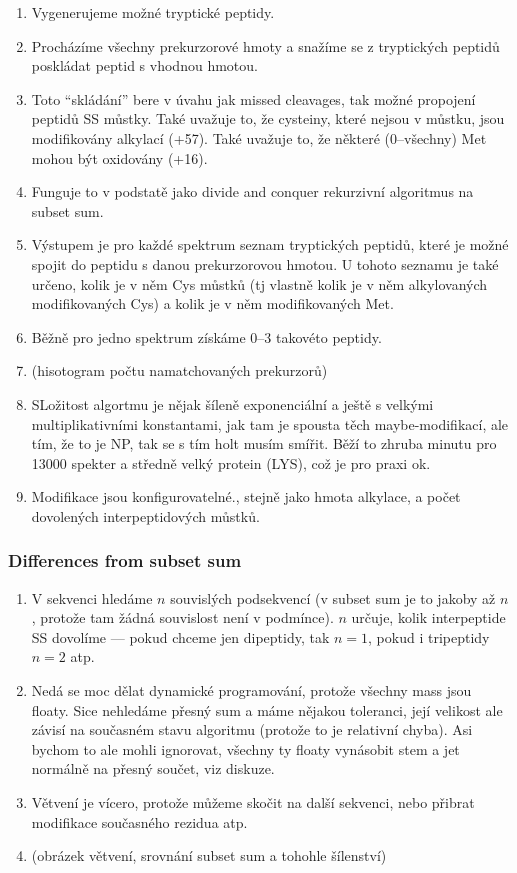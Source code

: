 \begin{enumerate}
	\item Vygenerujeme možné tryptické peptidy.
	\item Procházíme všechny prekurzorové hmoty a snažíme se z tryptických peptidů poskládat peptid s vhodnou hmotou.
	\item Toto ``skládání'' bere v úvahu jak missed cleavages, tak možné propojení peptidů SS můstky. Také uvažuje to, že cysteiny, které nejsou v můstku, jsou modifikovány alkylací (+57). Také uvažuje to, že některé (0–všechny) Met mohou být oxidovány (+16).
	\item Funguje to v podstatě jako divide and conquer rekurzivní algoritmus na subset sum.
	\item Výstupem je pro každé spektrum seznam tryptických peptidů, které je možné spojit do peptidu s danou prekurzorovou hmotou. U tohoto seznamu je také určeno, kolik je v něm Cys můstků (tj vlastně kolik je v něm alkylovaných modifikovaných Cys) a kolik je v něm modifikovaných Met.
	\item Běžně pro jedno spektrum získáme 0–3 takovéto peptidy.
	\item (hisotogram počtu namatchovaných prekurzorů)
	\item SLožitost algortmu je nějak šíleně exponenciální a ještě s velkými multiplikativními konstantami, jak tam je spousta těch maybe-modifikací, ale tím, že to je NP, tak se s tím holt musím smířit. Běží to zhruba minutu pro 13000 spekter a středně velký protein (LYS), což je pro praxi ok.
	\item Modifikace jsou konfigurovatelné., stejně jako hmota alkylace, a počet dovolených interpeptidových můstků.
\end{enumerate}

\subsubsection{Differences from subset sum}

\begin{enumerate}
	\item V sekvenci hledáme $n$ souvislých podsekvencí (v subset sum je to jakoby až $n$, protože tam žádná souvislost není v podmínce). $n$ určuje, kolik interpeptide SS dovolíme — pokud chceme jen dipeptidy, tak $n=1$, pokud i tripeptidy $n=2$ atp.
	\item Nedá se moc dělat dynamické programování, protože všechny mass jsou floaty. Sice nehledáme přesný sum a máme nějakou toleranci, její velikost ale závisí na současném stavu algoritmu (protože to je relativní chyba). Asi bychom to ale mohli ignorovat, všechny ty floaty vynásobit stem a jet normálně na přesný součet, viz diskuze.
	\item Větvení je vícero, protože můžeme skočit na další sekvenci, nebo přibrat modifikace současného rezidua atp.
	\item (obrázek větvení, srovnání subset sum a tohohle šílenství)
\end{enumerate}


